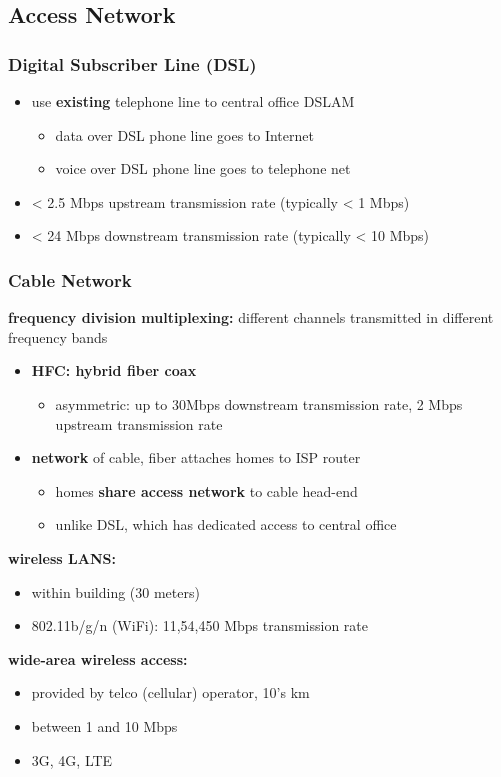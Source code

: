 \documentclass[12pt, a4paper]{article}
\begin{document}
\begin{multicols*}{2}
\subsection{Access Network}
\subsubsection{Digital Subscriber Line (DSL)}
\begin{itemize}
	\item use \textbf{existing} telephone line to central office DSLAM
	\begin{itemize}
		\item data over DSL phone line goes to Internet
		\item voice over DSL phone line goes to telephone net
	\end{itemize}
	\item < 2.5 Mbps upstream transmission rate (typically < 1 Mbps)
	\item < 24 Mbps downstream transmission rate (typically < 10 Mbps)
\end{itemize}
\subsubsection{Cable Network}
\begin{leftbar}
	\textbf{frequency division multiplexing:} different channels transmitted in different frequency bands
\end{leftbar}
\begin{itemize}
	\item \textbf{HFC: hybrid fiber coax}
	\begin{itemize}
		\item asymmetric: up to 30Mbps downstream transmission rate, 2 Mbps upstream transmission rate
	\end{itemize}
	\item \textbf{network} of cable, fiber attaches homes to ISP router
	\begin{itemize}
		\item homes \textbf{share access network} to cable head-end
		\item unlike DSL, which has dedicated access to central office
	\end{itemize}
\end{itemize}
	\textbf{wireless LANS:}
	\begin{itemize}
		\item within building (30 meters)
		\item 802.11b/g/n (WiFi): 11,54,450 Mbps transmission rate
	\end{itemize}
	\textbf{wide-area wireless access:}
	\begin{itemize}
		\item provided by telco (cellular) operator, 10's km
		\item between 1 and 10 Mbps
		\item 3G, 4G, LTE
	\end{itemize}


\end{multicols*}
\end{document}

